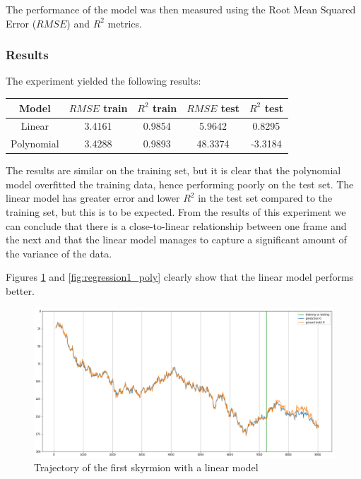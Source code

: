 \documentclass[a4paper]{article}
\begin{document}
  The performance of the model was then measured using the Root Mean Squared Error ($RMSE$) and $R^2$ metrics.

  \subsubsection{Results}
  The experiment yielded the following results:

  \begin{center}
    \begin{tabular}{ |c|c|c|c|c| } 
     \hline
     Model & $RMSE$ train & $R^2$ train & $RMSE$ test & $R^2$ test \\
     \hline\hline
     Linear & 3.4161 & 0.9854 & 5.9642 & 0.8295 \\ 
     Polynomial & 3.4288 & 0.9893 & 48.3374 & -3.3184 \\ 
     \hline
    \end{tabular}
  \end{center}

  The results are similar on the training set, but it is clear that the polynomial model overfitted the training data, hence performing poorly on the test set. The linear model has greater error and lower $R^2$ in the test set compared to the training set, but this is to be expected. From the results of this experiment we can conclude that there is a close-to-linear relationship between one frame and the next and that the linear model manages to capture a significant amount of the variance of the data.

  Figures \ref{fig:regression1_linear} and \ref{fig:regression1_poly} clearly show that the linear model performs better.
  
  \begin{figure}
    \centering
    \includegraphics[width=\textwidth]{regression1_linear}
    \caption{Trajectory of the first skyrmion with a linear model}
    \label{fig:regression1_linear}
  \end{figure}
\end{document}
